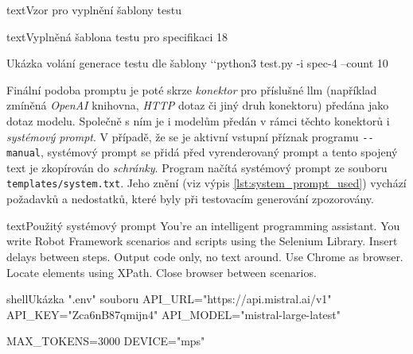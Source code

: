 \documentclass[czech, ma, kiv, he, iso690numb, pdf, viewonly]{fasthesis}
\begin{document}
\begin{code}{text}{Vzor pro vyplnění šablony testu \label{lst:template}}
{\begin{code}{text}{Vyplněná šablona testu pro specifikaci 18 \label{lst:spec18}}
{        
        \begin{console}{Ukázka volání generace testu dle šablony \label{con:generation}}
`\uxprompt`python3 test.py -i spec-4 --count 10 \end{console}

        Finální podoba promptu je poté skrze \textit{konektor} pro příslušné \Gls{llm} (například zmíněná \textit{OpenAI} knihovna, \textit{HTTP} dotaz či jiný druh konektoru) předána jako dotaz modelu. Společně s ním je i modelům předán v rámci těchto konektorů i \textit{systémový prompt}. V případě, že se je aktivní vstupní příznak programu \verb|--manual|, systémový prompt se přidá před vyrenderovaný prompt a tento spojený text je zkopírován do \textit{schránky}. Program načítá systémový prompt ze souboru \verb|templates/system.txt|. Jeho znění (viz výpis \ref{lst:system_prompt_used}) vychází požadavků a nedostatků, které byly při testovacím generování zpozorovány.

        \begin{code}{text}{Použitý systémový prompt \label{lst:system_prompt_used}}
You're an intelligent programming assistant. You write Robot Framework scenarios and scripts using the Selenium Library. Insert delays between steps. Output code only, no text around. Use Chrome as browser. Locate elements using XPath. Close browser between scenarios.  \end{code}

        \begin{code}{shell}{Ukázka ".env" souboru \label{lst:dot_env}}
API_URL="https://api.mistral.ai/v1"
API_KEY="Zca6nB87qmijn4"
API_MODEL="mistral-large-latest"

MAX_TOKENS=3000
DEVICE="mps" \end{code}

}
\end{code}}
\end{code}
\end{document}
